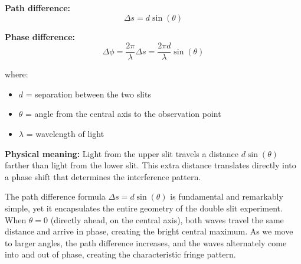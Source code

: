 \documentclass[
  a4paper,
]{book}
\providecommand{\tightlist}{%
  \setlength{\itemsep}{0pt}\setlength{\parskip}{0pt}}
\begin{document}
\begin{tcolorbox}[enhanced jigsaw, breakable, toptitle=1mm, bottomrule=.15mm, colbacktitle=quarto-callout-important-color!10!white, title=\textcolor{quarto-callout-important-color}{\faExclamation}\hspace{0.5em}{Path Difference and Phase Difference Formulas}, arc=.35mm, rightrule=.15mm, bottomtitle=1mm, opacityback=0, toprule=.15mm, coltitle=black, leftrule=.75mm, opacitybacktitle=0.6, colback=white, left=2mm, titlerule=0mm, colframe=quarto-callout-important-color-frame]

\textbf{Path difference:} \[\Delta s = d \sin(\theta)\]

\textbf{Phase difference:}
\[\Delta \phi = \frac{2\pi}{\lambda} \Delta s = \frac{2\pi d}{\lambda} \sin(\theta)\]

where:

\begin{itemize}
\tightlist
\item
  \(d\) = separation between the two slits
\item
  \(\theta\) = angle from the central axis to the observation point
\item
  \(\lambda\) = wavelength of light
\end{itemize}

\textbf{Physical meaning:} Light from the upper slit travels a distance
\(d\sin(\theta)\) farther than light from the lower slit. This extra
distance translates directly into a phase shift that determines the
interference pattern.

\end{tcolorbox}

The path difference formula \(\Delta s = d\sin(\theta)\) is fundamental
and remarkably simple, yet it encapsulates the entire geometry of the
double slit experiment. When \(\theta = 0\) (directly ahead, on the
central axis), both waves travel the same distance and arrive in phase,
creating the bright central maximum. As we move to larger angles, the
path difference increases, and the waves alternately come into and out
of phase, creating the characteristic fringe pattern.
\end{document}
